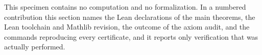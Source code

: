 
This specimen contains no computation and no formalization. In a numbered contribution
this section names the Lean declarations of the main theorems, the Lean toolchain and
Mathlib revision, the outcome of the axiom audit, and the commands reproducing every
certificate, and it reports only verification that was actually performed.
